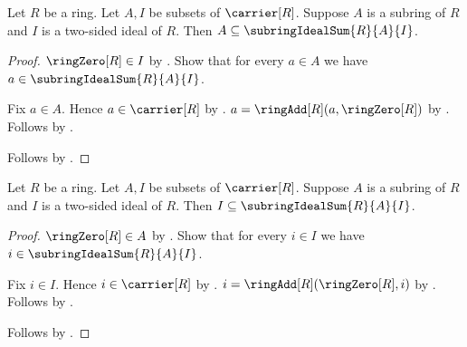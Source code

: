 \begin{proposition}\label{subring_ideal_sum_contains_subring}
    Let $R$ be a ring.
    Let $A,I$ be subsets of $\carrier[R]$.
    Suppose $A$ is a subring of $R$ and $I$ is a two-sided ideal of $R$.
    Then $A\subseteq\subringIdealSum{R}{A}{I}$.
\end{proposition}
\begin{proof}
    $\ringZero[R]\in I$ by
        .
    Show that for every $a\in A$ we have
        $a\in\subringIdealSum{R}{A}{I}$.
    \begin{subproof}
        Fix $a\in A$.
        Hence $a\in\carrier[R]$ by .
        $a=\ringAdd[R](a,\ringZero[R])$ by
            .
        Follows by .
    \end{subproof}
    Follows by .
\end{proof}

\begin{proposition}\label{subring_ideal_sum_contains_ideal}
    Let $R$ be a ring.
    Let $A,I$ be subsets of $\carrier[R]$.
    Suppose $A$ is a subring of $R$ and $I$ is a two-sided ideal of $R$.
    Then $I\subseteq\subringIdealSum{R}{A}{I}$.
\end{proposition}
\begin{proof}
    $\ringZero[R]\in A$ by
        .
    Show that for every $i\in I$ we have
        $i\in\subringIdealSum{R}{A}{I}$.
    \begin{subproof}
        Fix $i\in I$.
        Hence $i\in\carrier[R]$ by .
        $i=\ringAdd[R](\ringZero[R],i)$ by
            .
        Follows by .
    \end{subproof}
    Follows by .
\end{proof}

